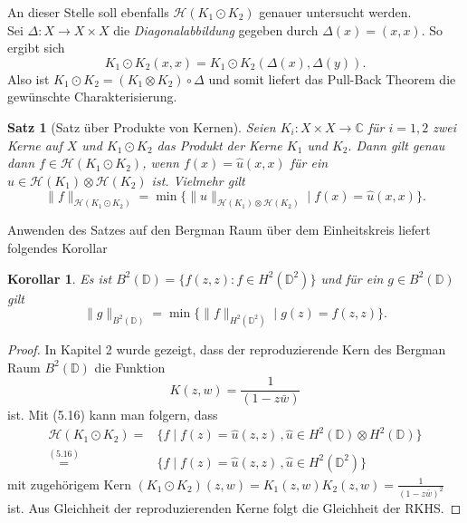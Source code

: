 \documentclass[12pt,titlepage,twoside,cleardoublepage]{article}
\theoremstyle{nummermitklammern}
\newtheorem{korollar}[temp]{Korollar}
\newtheorem{satz}[temp]{Satz}
\newtheorem{satz}[zahl]{Satz}
\numberwithin{equation}{section}
\newtheorem{korollar}[zahl]{Korollar}
\begin{document}
 An dieser Stelle soll ebenfalls $\mathcal{H}(K_1\odot K_2)$ genauer untersucht werden.\\
Sei $\Delta:X\to X\times X$ die \emph{Diagonalabbildung} gegeben durch $\Delta(x)=(x,x).$ So ergibt sich 
\[
K_1\odot K_2(x,x)=K_1\odot K_2(\Delta(x),\Delta (y)).
\] Also ist $K_1\odot K_2 =(K_1 \otimes K_2)\circ \Delta$ und somit liefert das Pull-Back Theorem die gewünschte Charakterisierung.
\begin{satz}[Satz über Produkte von Kernen]
Seien $K_i:X\times X\to \mathbb{C}$ für $i=1,2$ zwei Kerne auf $X$ und $K_1\odot K_2$ das Produkt der Kerne $K_1$ und $K_2.$ Dann gilt genau dann $f\in \mathcal{H}(K_1 \odot K_2)$, wenn $f(x)=\hat{u}(x,x)$ für ein $u\in\mathcal{H}(K_1)\otimes \mathcal{H}(K_2)$ ist. Vielmehr gilt 
\[
\|f\|_{\mathcal{H}(K_1\odot K_2)}=\min\{\|u\|_{\mathcal{H}(K_1)\otimes \mathcal{H}(K_2)}\mid f(x)=\hat{u}(x,x)\}.
\]   
\end{satz}
 Anwenden des Satzes auf den Bergman Raum über dem Einheitskreis liefert folgendes Korollar
\begin{korollar}
Es ist $B^2(\mathbb{D})=\{f(z,z):f\in H^2(\mathbb{D}^2)\}$ und für ein $g \in B^2(\mathbb{D})$ gilt 
\[
\|g\|_{B^2(\mathbb{D})}= \min\{\|f\|_{H^2(\mathbb{D}^2)}\mid g(z)=f(z,z)\}.
\]
\end{korollar}
\begin{proof}
In Kapitel 2 wurde gezeigt, dass der reproduzierende Kern des Bergman Raum $B^2(\mathbb{D})$ die Funktion  
\[
K(z,w)=\frac{1}{(1-z\bar{w})}
\]
ist. Mit (5.16) kann man folgern, dass 
\begin{align*}
\mathcal{H}(K_1 \odot K_2)=&\{f\mid f(z)=\hat{u}(z,z)\, ,\hat{u}\in H^2(\mathbb{D})\otimes H^2(\mathbb{D}) \}\\
\overset{(5.16)}{=}&\{f\mid f(z)=\hat{u}(z,z)\, ,\hat{u}\in H^2(\mathbb{D}^2) \}
\end{align*}
mit zugehörigem Kern $(K_1\odot K_2)(z,w)=K_1(z,w)K_2(z,w)=\frac{1}{(1-z\bar{w})^2}$ ist. Aus Gleichheit der reproduzierenden Kerne folgt die Gleichheit der RKHS.
\end{proof}
\end{document}
